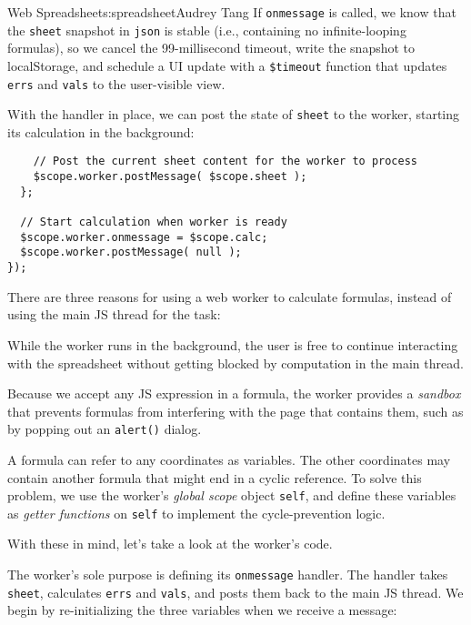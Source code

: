 \begin{aosachapter}{Web Spreadsheet}{s:spreadsheet}{Audrey Tang}
If \texttt{onmessage} is called, we know that the \texttt{sheet}
snapshot in \texttt{json} is stable (i.e., containing no
infinite-looping formulas), so we cancel the 99-millisecond timeout,
write the snapshot to localStorage, and schedule a UI update with a
\texttt{\$timeout} function that updates \texttt{errs} and \texttt{vals}
to the user-visible view.

With the handler in place, we can post the state of \texttt{sheet} to
the worker, starting its calculation in the background:

\begin{verbatim}
    // Post the current sheet content for the worker to process
    $scope.worker.postMessage( $scope.sheet );
  };

  // Start calculation when worker is ready
  $scope.worker.onmessage = $scope.calc;
  $scope.worker.postMessage( null );
});
\end{verbatim}

\label{js-background-worker}

There are three reasons for using a web worker to calculate formulas,
instead of using the main JS thread for the task:

\begin{aosaitemize}

\item
  While the worker runs in the background, the user is free to continue
  interacting with the spreadsheet without getting blocked by
  computation in the main thread.
\item
  Because we accept any JS expression in a formula, the worker provides
  a \emph{sandbox} that prevents formulas from interfering with the page
  that contains them, such as by popping out an \texttt{alert()} dialog.
\item
  A formula can refer to any coordinates as variables. The other
  coordinates may contain another formula that might end in a cyclic
  reference. To solve this problem, we use the worker's \emph{global
  scope} object \texttt{self}, and define these variables as
  \emph{getter functions} on \texttt{self} to implement the
  cycle-prevention logic.
\end{aosaitemize}

With these in mind, let's take a look at the worker's code.

The worker's sole purpose is defining its \texttt{onmessage} handler.
The handler takes \texttt{sheet}, calculates \texttt{errs} and
\texttt{vals}, and posts them back to the main JS thread. We begin by
re-initializing the three variables when we receive a message:


\end{aosachapter}
